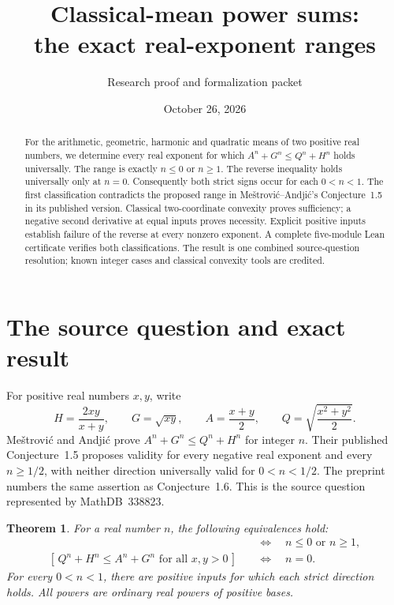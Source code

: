 \documentclass[11pt]{article}
\title{Classical-mean power sums:\\the exact real-exponent ranges}
\author{Research proof and formalization packet}
\date{October 26, 2026}
\newtheorem{theorem}{Theorem}
\begin{document}
\maketitle
\begin{abstract}
For the arithmetic, geometric, harmonic and quadratic means of two
positive real numbers, we determine every real exponent for which
$A^n+G^n\leq Q^n+H^n$ holds universally. The range is exactly
$n\leq0$ or $n\geq1$. The reverse inequality holds universally only
at $n=0$. Consequently both strict signs occur for each $0<n<1$.
The first classification contradicts the proposed range in
Me\v{s}trovi\'c--Andji\'c's Conjecture~1.5 in its published version.
Classical two-coordinate convexity proves sufficiency; a negative
second derivative at equal inputs proves necessity. Explicit positive
inputs establish failure of the reverse at every nonzero exponent.
A complete five-module Lean certificate verifies both classifications.
The result is one combined source-question resolution; known integer
cases and classical convexity tools are credited.
\end{abstract}

\section{The source question and exact result}
For positive real numbers $x,y$, write
\[
 H=\frac{2xy}{x+y},\qquad G=\sqrt{xy},\qquad
 A=\frac{x+y}{2},\qquad Q=\sqrt{\frac{x^2+y^2}{2}}.
\]
Me\v{s}trovi\'c and Andji\'c \cite{MA} prove
$A^n+G^n\leq Q^n+H^n$ for integer $n$. Their published
Conjecture~1.5 proposes validity for every negative real exponent and
every $n\geq1/2$, with neither direction universally valid for
$0<n<1/2$. The preprint numbers the same assertion as
Conjecture~1.6. This is the source question represented by
MathDB~338823.

\begin{theorem}\label{thm:classification}
For a real number $n$, the following equivalences hold:
\begin{align}
 [\,A^n+G^n\leq Q^n+H^n\text{ for all }x,y>0\,]
 &\quad\Longleftrightarrow\quad n\leq0\text{ or }n\geq1,
 \label{eq:forward}\\
 [\,Q^n+H^n\leq A^n+G^n\text{ for all }x,y>0\,]
 &\quad\Longleftrightarrow\quad n=0.
 \label{eq:reverse}
\end{align}
For every $0<n<1$, there are positive inputs for which each strict
direction holds. All powers are ordinary real powers of positive bases.
\end{theorem}
\end{document}
